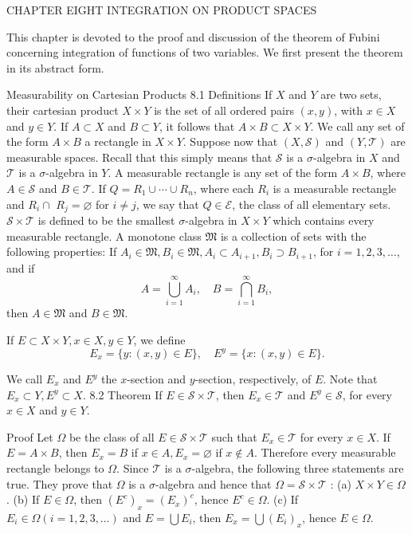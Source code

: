 CHAPTER
EIGHT
INTEGRATION ON PRODUCT SPACES

This chapter is devoted to the proof and discussion of the theorem of Fubini concerning integration of functions of two variables. We first present the theorem in its abstract form.

Measurability on Cartesian Products
8.1 Definitions If $X$ and $Y$ are two sets, their cartesian product $X \times Y$ is the set of all ordered pairs $(x, y)$, with $x \in X$ and $y \in Y$. If $A \subset X$ and $B \subset Y$, it follows that $A \times B \subset X \times Y$. We call any set of the form $A \times B$ a rectangle in $X \times Y$.
Suppose now that $(X, \mathscr{S})$ and $(Y, \mathscr{T})$ are measurable spaces. Recall that this simply means that $\mathscr{S}$ is a $\sigma$-algebra in $X$ and $\mathscr{T}$ is a $\sigma$-algebra in $Y$.
A measurable rectangle is any set of the form $A \times B$, where $A \in \mathscr{S}$ and $B \in \mathscr{T}$.
If $Q=R_1 \cup \cdots \cup R_n$, where each $R_i$ is a measurable rectangle and $R_i \cap$ $R_j=\varnothing$ for $i \neq j$, we say that $Q \in \mathscr{E}$, the class of all elementary sets.
$\mathscr{S} \times \mathscr{T}$ is defined to be the smallest $\sigma$-algebra in $X \times Y$ which contains every measurable rectangle.
A monotone class $\mathfrak{M}$ is a collection of sets with the following properties: If $A_i \in \mathfrak{M}, B_i \in \mathfrak{M}, A_i \subset A_{i+1}, B_i \supset B_{i+1}$, for $i=1,2,3, \ldots$, and if
$$
A=\bigcup_{i=1}^{\infty} A_i, \quad B=\bigcap_{i=1}^{\infty} B_i,
$$
then $A \in \mathfrak{M}$ and $B \in \mathfrak{M}$.

If $E \subset X \times Y, x \in X, y \in Y$, we define
$$
E_x=\{y:(x, y) \in E\}, \quad E^y=\{x:(x, y) \in E\} .
$$

We call $E_x$ and $E^y$ the $x$-section and $y$-section, respectively, of $E$. Note that $E_x \subset Y, E^y \subset X$.
8.2 Theorem If $E \in \mathscr{S} \times \mathscr{T}$, then $E_x \in \mathscr{T}$ and $E^y \in \mathscr{S}$, for every $x \in X$ and $y \in Y$.

Proof Let $\Omega$ be the class of all $E \in \mathscr{S} \times \mathscr{T}$ such that $E_x \in \mathscr{T}$ for every $x \in X$. If $E=A \times B$, then $E_x=B$ if $x \in A, E_x=\varnothing$ if $x \notin A$. Therefore every measurable rectangle belongs to $\Omega$. Since $\mathscr{T}$ is a $\sigma$-algebra, the following three statements are true. They prove that $\Omega$ is a $\sigma$-algebra and hence that $\Omega=\mathscr{S} \times \mathscr{T}$ :
(a) $X \times Y \in \Omega$.
(b) If $E \in \Omega$, then $\left(E^c\right)_x=\left(E_x\right)^c$, hence $E^c \in \Omega$.
(c) If $E_i \in \Omega(i=1,2,3, \ldots)$ and $E=\bigcup E_i$, then $E_x=\bigcup\left(E_i\right)_x$, hence $E \in \Omega$.

